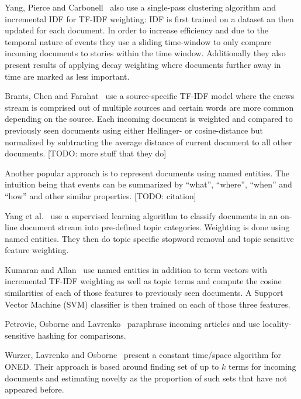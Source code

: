 Yang, Pierce and Carbonell~\cite{yang1998study} also use a single-pass clustering algorithm and incremental IDF for TF-IDF weighting: IDF is first trained on a dataset an then updated for each document. In order to increase efficiency and due to the temporal nature of events they use a sliding time-window to only compare incoming documents to stories within the time window. Additionally they also present results of applying decay weighting where documents further away in time are marked as less important.

Brants, Chen and Farahat~\cite{brants2003system} use a source-specific TF-IDF model where the enews stream is comprised out of multiple sources and certain words are more common depending on the source. Each incoming document is weighted and compared to previously seen documents using either Hellinger- or cosine-distance but normalized by subtracting the average distance of current document to all other documents. [TODO: more stuff that they do]

Another popular approach is to represent documents using named entities. The intuition being that events can be summarized  by ``what'', ``where'', ``when'' and ``how'' and other similar properties. [TODO: citation]

Yang et al.~\cite{yang2002topic} use a supervised learning algorithm to classify documents in an on-line document stream into pre-defined topic categories. Weighting is done using named entities. They then do topic specific stopword removal and topic sensitive feature weighting.

Kumaran and Allan~\cite{kumaran2005using} use named entities in addition to term vectors with incremental TF-IDF weighting as well as topic terms and compute the cosine similarities of each of those features to previously seen documents. A Support Vector Machine (SVM) classifier is then trained on each of those three features.



Petrovic, Osborne and Lavrenko~\cite{petrovic2012using} paraphrase incoming articles and use locality-sensitive hashing for comparisons. 

Wurzer, Lavrenko and Osborne~\cite{wurzer2015kterm} present a constant time/space algorithm for ONED. Their approach is based around finding set of up to $k$ terms for incoming documents and estimating novelty as the proportion of such sets that have not appeared before. 
